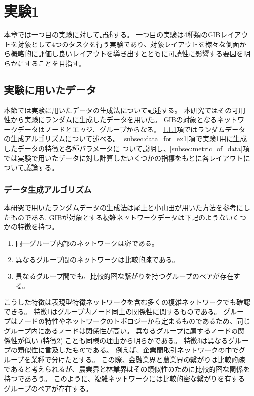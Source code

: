 \documentclass{kuee}
\begin{document}
\chapter{実験1}
\label{chap:experiment1}
本章では一つ目の実験に対して記述する。
一つ目の実験は4種類のGIBレイアウトを対象として4つのタスクを行う実験であり、対象レイアウトを様々な側面から概略的に評価し良いレイアウトを導き出すとともに可読性に影響する要因を明らかにすることを目指す。

\section{実験に用いたデータ}
\label{sec:data}
本節では実験に用いたデータの生成法について記述する。
本研究ではその可用性から実験にランダムに生成したデータを用いた。
GIBの対象となるネットワークデータはノードとエッジ、グループからなる。
\ref{subsec:data_algorithm}項ではランダムデータの生成アルゴリズムについて述べる。
\ref{subsec:data_for_ex1}項で実験1用に生成したデータの特徴と各種パラメータに
ついて説明し、\ref{subsec:metric_of_data}項では実験で用いたデータに対し計算したいくつかの指標をもとに各レイアウトについて議論する。

\subsection{データ生成アルゴリズム}
\label{subsec:data_algorithm}

本研究で用いたランダムデータの生成法は尾上と小山田が用いた方法を参考にしたものである\cite{onoue2017optimal}.
GIBが対象とする複雑ネットワークデータは下記のようないくつかの特徴を持つ。
\begin{enumerate}
  \item 同一グループ内部のネットワークは密である。
  \item 異なるグループ間のネットワークは比較的疎である。
  \item 異なるグループ間でも、比較的密な繋がりを持つグループのペアが存在する。
\end{enumerate}
こうした特徴は表現型特徴ネットワークを含む多くの複雑ネットワークでも確認できる。
特徴1はグループ内ノード同士の関係性に関するものである。
グループはノードの特性やネットワークのトポロジーから定まるものであるため、同じグループ内にあるノードは関係性が高い。
異なるグループに属するノードの関係性が低い (特徴2) ことも同様の理由から明らかである。
特徴3は異なるグループの類似性に言及したものである。
例えば、企業間取引ネットワークの中でグループを業種で分けたとする。
この際、金融業界と農業界の繋がりは比較的疎であると考えられるが、農業界と林業界はその類似性のために比較的密な関係を持つであろう。
このように、複雑ネットワークには比較的密な繋がりを有するグループのペアが存在する。
\end{document}
